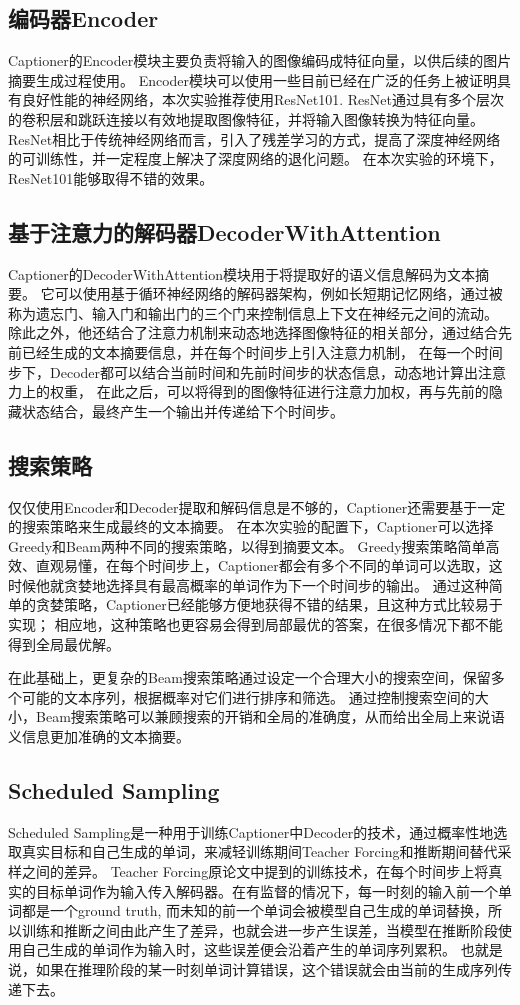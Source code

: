 \documentclass[]{ctexart}
\begin{document}
\subsection{编码器Encoder}
Captioner的Encoder模块主要负责将输入的图像编码成特征向量，以供后续的图片摘要生成过程使用。
Encoder模块可以使用一些目前已经在广泛的任务上被证明具有良好性能的神经网络，本次实验推荐使用ResNet101.
ResNet通过具有多个层次的卷积层和跳跃连接以有效地提取图像特征，并将输入图像转换为特征向量。
ResNet相比于传统神经网络而言，引入了残差学习的方式，提高了深度神经网络的可训练性，并一定程度上解决了深度网络的退化问题。
在本次实验的环境下，ResNet101能够取得不错的效果。

\subsection{基于注意力的解码器DecoderWithAttention}
Captioner的DecoderWithAttention模块用于将提取好的语义信息解码为文本摘要。
它可以使用基于循环神经网络的解码器架构，例如长短期记忆网络，通过被称为遗忘门、输入门和输出门的三个门来控制信息上下文在神经元之间的流动。
除此之外，他还结合了注意力机制来动态地选择图像特征的相关部分，通过结合先前已经生成的文本摘要信息，并在每个时间步上引入注意力机制，
在每一个时间步下，Decoder都可以结合当前时间和先前时间步的状态信息，动态地计算出注意力上的权重，
在此之后，可以将得到的图像特征进行注意力加权，再与先前的隐藏状态结合，最终产生一个输出并传递给下个时间步。

\subsection{搜索策略}
仅仅使用Encoder和Decoder提取和解码信息是不够的，Captioner还需要基于一定的搜索策略来生成最终的文本摘要。
在本次实验的配置下，Captioner可以选择Greedy和Beam两种不同的搜索策略，以得到摘要文本。
Greedy搜索策略简单高效、直观易懂，在每个时间步上，Captioner都会有多个不同的单词可以选取，这时候他就贪婪地选择具有最高概率的单词作为下一个时间步的输出。
通过这种简单的贪婪策略，Captioner已经能够方便地获得不错的结果，且这种方式比较易于实现；
相应地，这种策略也更容易会得到局部最优的答案，在很多情况下都不能得到全局最优解。

在此基础上，更复杂的Beam搜索策略通过设定一个合理大小的搜索空间，保留多个可能的文本序列，根据概率对它们进行排序和筛选。
通过控制搜索空间的大小，Beam搜索策略可以兼顾搜索的开销和全局的准确度，从而给出全局上来说语义信息更加准确的文本摘要。

\subsection{Scheduled Sampling}
Scheduled Sampling是一种用于训练Captioner中Decoder的技术，通过概率性地选取真实目标和自己生成的单词，来减轻训练期间Teacher Forcing和推断期间替代采样之间的差异。
Teacher Forcing原论文中提到的训练技术，在每个时间步上将真实的目标单词作为输入传入解码器。在有监督的情况下，每一时刻的输入前一个单词都是一个ground truth,
而未知的前一个单词会被模型自己生成的单词替换，所以训练和推断之间由此产生了差异，也就会进一步产生误差，当模型在推断阶段使用自己生成的单词作为输入时，这些误差便会沿着产生的单词序列累积。
也就是说，如果在推理阶段的某一时刻单词计算错误，这个错误就会由当前的生成序列传递下去。
\end{document}

